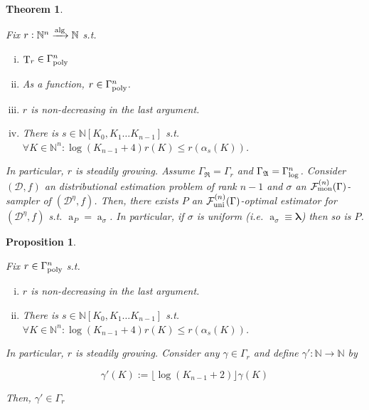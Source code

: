 \documentclass[11pt]{article}
\numberwithin{equation}{section}
\theoremstyle{definition}
\theoremstyle{plain}
\newtheorem{theorem}{Theorem}[section]
\newtheorem{proposition}{Proposition}[section]
\DeclareMathOperator{\T}{T}
\DeclareMathOperator{\A}{a}
\newcommand{\Nats}{\mathbb{N}}
\newcommand{\NatPoly}{\Nats[K_0, K_1 \ldots K_{n-1}]}
\newcommand{\Estr}{\bm{\lambda}}
\newcommand{\Floor}[1]{\lfloor #1 \rfloor}
\newcommand{\Dist}{\mathcal{D}}
\newcommand{\GrowR}{\Gamma_{\mathfrak{R}}}
\newcommand{\GrowA}{\Gamma_{\mathfrak{A}}}
\newcommand{\Fall}{\mathcal{F}}
\newcommand{\GammaPoly}{\Gamma_{\textnormal{poly}}}
\newcommand{\FallU}{{\Fall_{\textnormal{uni}}^{(n)}}}
\newcommand{\FallM}{\Fall_{\textnormal{mon}}^{(n)}}
\newcommand{\Alg}{\xrightarrow{\textnormal{alg}}}
\begin{document}
\begin{samepage}
\begin{theorem}
\label{thm:exists_smp}

Fix ${r: \Nats^n \Alg \Nats}$ s.t.

\begin{enumerate}[(i)]

\item ${\T_r \in \GammaPoly^n}$

\item As a function, ${r \in \GammaPoly^n}$.

\item ${r}$ is non-decreasing in the last argument.

\item There is ${s \in \NatPoly}$ s.t. ${\forall K \in \Nats^n: \log(K_{n-1}+4)r(K) \leq r(\alpha_s(K))}$.

\end{enumerate}

In particular, ${r}$ is steadily growing. Assume ${\GrowR=\Gamma_r}$ and ${\GrowA=\Gamma_\textnormal{log}^n}$. Consider ${(\Dist,f)}$ an distributional estimation problem of rank ${n-1}$ and ${\sigma}$ an ${\FallM(\Gamma)}$-sampler of ${(\Dist^\eta,f)}$. Then, there exists ${P}$ an ${\FallU(\Gamma)}$-optimal estimator for ${(\Dist^\eta,f)}$ s.t. ${\A_P=\A_\sigma}$. In particular, if ${\sigma}$ is uniform (i.e. ${\A_\sigma \equiv \Estr}$) then so is ${P}$.


\end{theorem}
\end{samepage}

\begin{samepage}
\begin{proposition}
\label{prp:std_grow_log}

Fix ${r \in \GammaPoly^n}$ s.t.

\begin{enumerate}[(i)]

\item ${r}$ is non-decreasing in the last argument.

\item There is ${s \in \NatPoly}$ s.t. ${\forall K \in \Nats^n: \log(K_{n-1}+4)r(K) \leq r(\alpha_s(K))}$.

\end{enumerate}

In particular, ${r}$ is steadily growing. Consider any ${\gamma \in \Gamma_r}$ and define ${\gamma': \Nats \rightarrow \Nats}$ by 

\[\gamma'(K):=\Floor{\log(K_{n-1}+2)}\gamma(K)\]

Then, ${\gamma' \in \Gamma_r}$

\end{proposition}
\end{samepage}
\end{document}

